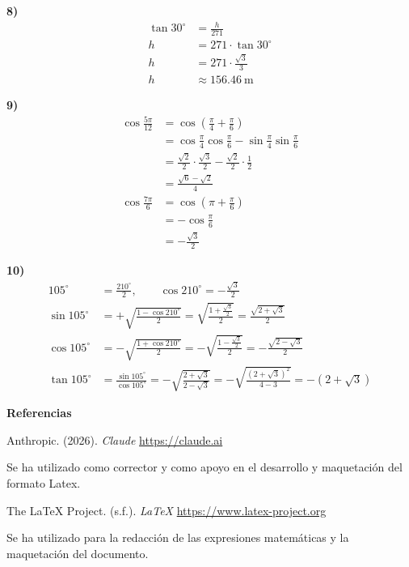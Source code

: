 \documentclass[11pt,a4paper,fleqn]{article}
\begin{document}
\textbf{8)}
\begin{align*}
  \tan 30^{\circ} &= \frac{h}{271} \\[6pt]
  h &= 271 \cdot \tan 30^{\circ} \\[6pt]
  h &= 271 \cdot \frac{\sqrt{3}}{3} \\[6pt]
  h &\approx 156.46\ \text{m}
\end{align*}

\textbf{9)}
\begin{align*}
  \cos\frac{5\pi}{12}
    &= \cos\left( \frac{\pi}{4} + \frac{\pi}{6} \right) \\[6pt]
    &= \cos\frac{\pi}{4}\cos\frac{\pi}{6} - \sin\frac{\pi}{4}\sin\frac{\pi}{6} \\[6pt]
    &= \frac{\sqrt{2}}{2} \cdot \frac{\sqrt{3}}{2} - \frac{\sqrt{2}}{2} \cdot \frac{1}{2} \\[6pt]
    &= \frac{\sqrt{6} - \sqrt{2}}{4} \\[14pt]
  \cos\frac{7\pi}{6}
    &= \cos\left( \pi + \frac{\pi}{6} \right) \\[6pt]
    &= -\cos\frac{\pi}{6} \\[6pt]
    &= -\frac{\sqrt{3}}{2}
\end{align*}

\textbf{10)}
\begin{align*}
  105^{\circ} &= \frac{210^{\circ}}{2}, \qquad
  \cos 210^{\circ} = -\frac{\sqrt{3}}{2} \\[10pt]
  \sin 105^{\circ}
    &= +\sqrt{\frac{1 - \cos 210^{\circ}}{2}}
     = \sqrt{\frac{1 + \frac{\sqrt{3}}{2}}{2}}
     = \frac{\sqrt{2 + \sqrt{3}}}{2} \\[10pt]
  \cos 105^{\circ}
    &= -\sqrt{\frac{1 + \cos 210^{\circ}}{2}}
     = -\sqrt{\frac{1 - \frac{\sqrt{3}}{2}}{2}}
     = -\frac{\sqrt{2 - \sqrt{3}}}{2} \\[10pt]
  \tan 105^{\circ}
    &= \frac{\sin 105^{\circ}}{\cos 105^{\circ}}
     = -\sqrt{\frac{2 + \sqrt{3}}{2 - \sqrt{3}}}
     = -\sqrt{\frac{(2 + \sqrt{3})^{2}}{4 - 3}}
     = -\left( 2 + \sqrt{3} \right)
\end{align*}


\newpage
\begin{center}
  \textbf{Referencias}
\end{center}

\begin{list}{}{\setlength{\leftmargin}{1.27cm}\setlength{\itemindent}{-1.27cm}\setlength{\itemsep}{1.2em}}
  \item Anthropic. (2026). \textit{Claude} \url{https://claude.ai}\par
        Se ha utilizado como corrector y como apoyo en el desarrollo y maquetación del formato Latex.
  \item The LaTeX Project. (s.f.). \textit{LaTeX} \url{https://www.latex-project.org}\par
        Se ha utilizado para la redacción de las expresiones matemáticas y la maquetación del documento.
\end{list}

\end{document}
